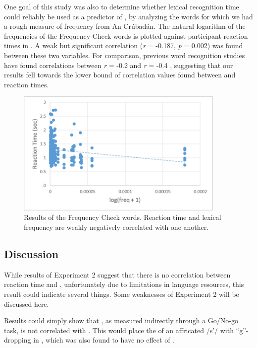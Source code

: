 \documentclass[output=paper
,newtxmath
,modfonts
,nonflat]{langsci/langscibook}
\begin{document}
One goal of this study was also to determine whether lexical recognition time could reliably be used as a predictor of , by analyzing the words for which we had a rough measure of frequency from An Crúbadán. The natural logarithm of the frequencies of the Frequency Check words is plotted against participant reaction times in . A weak but significant correlation (\textit{r} = -0.187, \textit{p} = 0.002) was found between these two variables. For comparison, previous word recognition studies have found correlations between \textit{r} = -0.2 and \textit{r} = -0.4 \citep{brysbaert2011word}, suggesting that our results fell towards the lower bound of correlation values found between  and reaction times.

   

\begin{figure}
\includegraphics[width=0.9\textwidth]{figures/fig-moeng-6}
\caption{Results of the Frequency Check words. Reaction time and lexical frequency are weakly negatively correlated with one another.}
\label{fig:moeng:7}
\end{figure}

\subsection{Discussion}\label{sec:moeng:6.4}

While results of Experiment 2 suggest that there is no correlation between reaction time and , unfortunately due to limitations in language resources, this result could indicate several things. Some weaknesses of Experiment 2 will be discussed here.

Results could simply show that , as measured indirectly through a Go/No-go task, is not correlated with . This would place the  of an affricated /s’/ with “g”-dropping in , which was also found to have no effect of  \citep{labov2011principles}.
\end{document}
